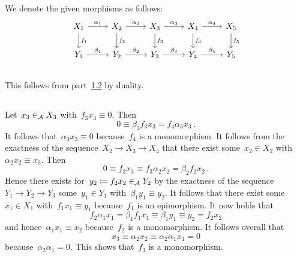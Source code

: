 \section{}
\label{five lemma}


We denote the given morphisms as follows:
\[
  \begin{tikzcd}
      X_1
      \arrow{r}[above]{\alpha_1}
      \arrow{d}[right]{f_1}
    & X_2
      \arrow{r}[above]{\alpha_2}
      \arrow{d}[right]{f_2}
    & X_3
      \arrow{r}[above]{\alpha_3}
      \arrow{d}[right]{f_3}
    & X_4
      \arrow{r}[above]{\alpha_4}
      \arrow{d}[right]{f_4}
    & X_5
      \arrow{d}[right]{f_5}
    \\
      Y_1
      \arrow{r}[above]{\beta_1}
    & Y_2
      \arrow{r}[above]{\beta_2}
    & Y_3
      \arrow{r}[above]{\beta_3}
    & Y_4
      \arrow{r}[above]{\beta_4}
    & Y_5
  \end{tikzcd}
\]



\subsection{}
\label{four lemma ugly}

This follows from part~\ref{four lemma nice} by duality.





\subsection{}
\label{four lemma nice}

Let~$x_3 \in_{\mathcal{A}} X_3$ with~$f_3 x_3 \equiv 0$.
Then
\[
          0
  \equiv  \beta_3 f_3 x_3
  =       f_4 \alpha_3 x_3 \,.
\]
It follows that~$\alpha_3 x_3 \equiv 0$ because~$f_4$ is a monomorphism.
It follows from the exactness of the sequence~$X_2 \to X_3 \to X_4$ that there exist some~$x_2 \in X_2$ with~$\alpha_2 x_2 \equiv x_3$.
Then
\[
          0
  \equiv  f_3 x_3
  \equiv  f_3 \alpha_2 x_2
  =       \beta_2 f_2 x_2 \,.
\]
Hence there exists for~$y_2 \coloneqq f_2 x_2 \in_{\mathcal{A}} Y_2$ by the exactness of the sequence~$Y_1 \to Y_2 \to Y_3$ some~$y_1 \in Y_1$ with~$\beta_1 y_1 \equiv y_2$.
It follows that there exist some~$x_1 \in X_1$ with~$f_1 x_1 \equiv y_1$ because~$f_1$ is an epimorphism.
It now holds that
\[
          f_2 \alpha_1 x_1
  =       \beta_1 f_1 x_1
  \equiv  \beta_1 y_1
  \equiv  y_2
  =       f_2 x_2
\]
and hence~$\alpha_1 x_1 \equiv x_2$ because~$f_2$ is a monomorphism.
It follows overall that
\[
          x_3
  \equiv  \alpha_2 x_2
  \equiv  \alpha_2 \alpha_1 x_1
  =       0
\]
because~$\alpha_2 \alpha_1 = 0$.
This shows that~$f_3$ is a monomorphism.





